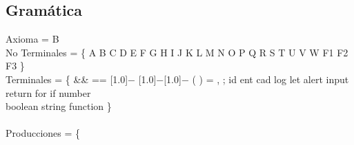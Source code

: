\documentclass[11pt, , a4paper, titlepage]{article}
\newcommand{\minus}{\scalebox{0.75}[1.0]{$-$}}
\begin{document}
\subsection{Gramática}
Axioma = B\\
No Terminales = \{ A B C D E F G H I J K L M N O P Q R S T U V W F1 F2 F3 \}\\
Terminales = \{ \&\& == \minus \hspace{0.1cm} \minus\minus \hspace{0.1cm} (\hspace{0.1cm}  ) =\hspace{0.1cm}  ,\hspace{0.1cm}  ; { } id %
ent cad log let alert input return for if number\\
\hspace*{2.65cm}boolean string function \}\\\\
Producciones = \{\\
\setlength{\tabcolsep}{1.5cm}
\end{document}
